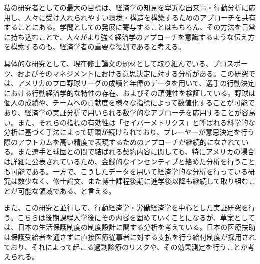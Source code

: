 \documentclass[dvipdfmx, 12pt]{jsarticle}
\begin{document}
私の研究者としての最大の目標は、経済学の知見を卑近な出来事・行動分析に応用し、人々に受け入れられやすい環境・構造を構築するためのアプローチを共有することにある。学問としての発展に寄与することはもちろん、その方法を日常に持ち込むことで、人々がより強く経済学のアプローチを意識するような伝え方を模索するのも、経済学者の重要な役割であると考える。

具体的な研究として、現在修士論文の題材として取り組んでいる、プロスポーツ、およびそのマネジメントにおける意思決定に対する分析がある。この研究では、アメリカのプロ野球リーグの成績と年俸のデータを用いて、選手の行動決定における行動経済学的な特性の存在、およびその頑健性を検証している。野球は個人の成績や、チームへの貢献度を様々な指標によって数値化することが可能であり、経済学の実証分析で用いられる数学的なアプローチを応用することが容易い。また、それらの指標の有効性は「セイバーメトリクス」と呼ばれる科学的な分析に基づく手法によって研鑽が続けられており、プレーヤーが意思決定を行う際のアウトカムを高い精度で表現するためのアプローチが継続的になされている。また選手と球団との間で結ばれる契約内容に関しても、特にアメリカの場合は詳細に公表されているため、金銭的なインセンティブと絡めた分析を行うことも可能である。一方で、こうしたデータを用いて経済学的な分析を行っている研究は数少なく、修士論文、また博士課程後期に進学後以降も継続して取り組むことが可能な領域である、と言える。

また、この研究と並行して、行動経済学・労働経済学を中心とした実証研究を行う。こちらは後期課程入学後にその内容を固めていくことになるが、草案としては、日本の生活保護制度の制度設計に関する分析を考えている。日本の医療扶助は保護受給者を通さずに直接医療従事者に対する支払を行う給付制度が採用されており、それによって起こる過剰診療のリスクや、その効果測定を行うことが考えられる。
\end{document}
